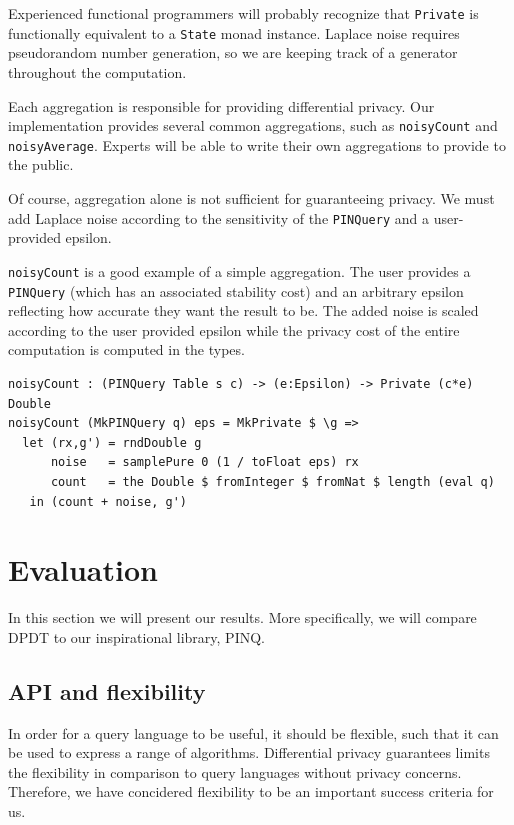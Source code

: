 \documentclass[12pt]{article}
\begin{document}
Experienced functional programmers will probably recognize that \texttt{Private} is functionally equivalent to a \texttt{State} monad instance.
Laplace noise requires pseudorandom number generation, so we are keeping track of a generator throughout the computation.

Each aggregation is responsible for providing differential privacy.
Our implementation provides several common aggregations, such as \texttt{noisyCount} and \texttt{noisyAverage}.
Experts will be able to write their own aggregations to provide to the public.

Of course, aggregation alone is not sufficient for guaranteeing privacy.
We must add Laplace noise according to the sensitivity of the \texttt{PINQuery} and a user-provided epsilon.

\texttt{noisyCount} is a good example of a simple aggregation.
The user provides a \texttt{PINQuery} (which has an associated stability cost) and an arbitrary epsilon reflecting how accurate they want the result to be.
The added noise is scaled according to the user provided epsilon while the privacy cost of the entire computation is computed in the types.

\begin{lstlisting}
noisyCount : (PINQuery Table s c) -> (e:Epsilon) -> Private (c*e) Double
noisyCount (MkPINQuery q) eps = MkPrivate $ \g => 
  let (rx,g') = rndDouble g
      noise   = samplePure 0 (1 / toFloat eps) rx
      count   = the Double $ fromInteger $ fromNat $ length (eval q)
   in (count + noise, g')
\end{lstlisting}

\section{Evaluation}\label{sec:evaluation}

In this section we will present our results.
More specifically, we will compare DPDT to our inspirational library, PINQ.

\subsection{API and flexibility}

In order for a query language to be useful, it should be flexible, such that it can be used to express a range of algorithms.
Differential privacy guarantees limits the flexibility in comparison to query languages without privacy concerns.
Therefore, we have concidered flexibility to be an important success criteria for us.
\end{document}
